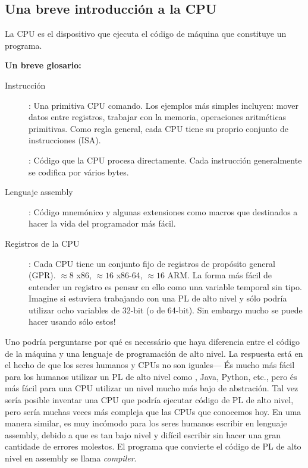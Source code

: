 \subsection{Una breve introducción a la CPU}

La \ac{CPU} es el dispositivo que ejecuta el código de máquina que constituye un programa.

\textbf{Un breve glosario:}

\begin{description}
\item[Instrucción]: Una primitiva \ac{CPU} comando.
Los ejemplos más simples incluyen: mover datos entre registros, trabajar con la memoria, operaciones aritméticas primitivas.
Como regla general, cada \ac{CPU} tiene su proprio conjunto de instrucciones (\ac{ISA}).

\item[\ESph{}]: Código que la \ac{CPU} procesa directamente. 
Cada instrucción generalmente se codifica por vários bytes.
\item[Lenguaje assembly]: Código mnemónico y algunas extensiones como macros que destinados a hacer la vida del programador más fácil.
\item[Registros de la CPU]: 
Cada \ac{CPU} tiene un conjunto fijo de registros de propósito general (\ac{GPR}).
$\approx 8$ \ESph{} x86, $\approx 16$ \ESph{} x86-64, $\approx 16$ \ESph{} ARM.
La forma más fácil de entender un registro es pensar en ello como una variable temporal sin tipo.
Imagine si estuviera trabajando con una \ac{PL} de alto nivel y sólo podría utilizar ocho variables de 32-bit (o de 64-bit).
Sin embargo mucho se puede hacer usando sólo estos!
\end{description}

Uno podría perguntarse por qué es necessário que haya diferencia entre el código de la máquina y una lenguaje de programación de alto nivel.  La respuesta está en el hecho de que los seres humanos y CPUs no son iguales---%
És mucho más fácil para los humanos utilizar un \ac{PL} de alto nivel como \CCpp, Java, Python, etc., pero és más fácil para una \ac{CPU} utilizar un nivel mucho más bajo de abstración.
Tal vez sería posible inventar una \ac{CPU} que podría ejecutar código de \ac{PL} de alto nivel, pero sería muchas veces más compleja que las \ac{CPU}s que conocemos hoy.
En uma manera similar, es muy incómodo para los seres humanos escribir en lenguaje assembly, debido a que es tan bajo nivel y difícil escribir sin hacer una gran cantidade de errores molestos.
El programa que convierte el código de \ac{PL} de alto nivel en assembly se llama \emph{compiler}.

